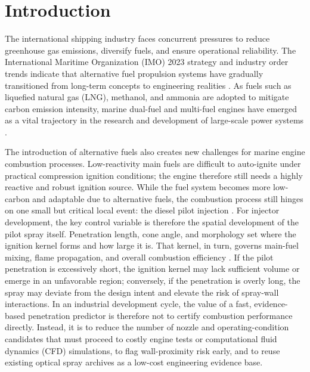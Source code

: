 \section{Introduction}

The international shipping industry faces concurrent pressures to reduce greenhouse gas emissions, diversify fuels, and ensure operational reliability.
The International Maritime Organization (IMO) 2023 strategy and industry order trends indicate that alternative fuel propulsion systems have gradually transitioned from long-term concepts to engineering realities
\cite{imo2023ghgstrategy,classnk2025alternativefuels}.
As fuels such as liquefied natural gas (LNG), methanol, and ammonia are adopted to mitigate carbon emission intensity, marine dual-fuel and multi-fuel engines have emerged as a vital trajectory in the research and development of large-scale power systems
\cite{wingd_lng_faq_2025,wingd_ammonia_faq_2025,classnk_methanol_2024}.

The introduction of alternative fuels also creates new challenges for marine engine combustion processes.
Low-reactivity main fuels are difficult to auto-ignite under practical compression ignition conditions; the engine therefore still needs a highly reactive and robust ignition source.
While the fuel system becomes more low-carbon and adaptable due to alternative fuels, the combustion process still hinges on one small but critical local event: the diesel pilot injection
\cite{wingd_xdf_manual_2021,classnk_methanol_2024}.
For injector development, the key control variable is therefore the spatial development of the pilot spray itself. Penetration length, cone angle, and morphology set where the ignition kernel forms and how large it is. That kernel, in turn, governs main-fuel mixing, flame propagation, and overall combustion efficiency
\cite{Karim2015DualFuel,WeiGeng2016DualFuelReview,Sahoo2009DualFuelReview}.
If the pilot penetration is excessively short, the ignition kernel may lack sufficient volume or emerge in an unfavorable region; conversely, if the penetration is overly long, the spray may deviate from the design intent and elevate the risk of spray-wall interactions.
In an industrial development cycle, the value of a fast, evidence-based penetration predictor is therefore not to certify combustion performance directly. Instead, it is to reduce the number of nozzle and operating-condition candidates that must proceed to costly engine tests or computational fluid dynamics (CFD) simulations, to flag wall-proximity risk early, and to reuse existing optical spray archives as a low-cost engineering evidence base.

